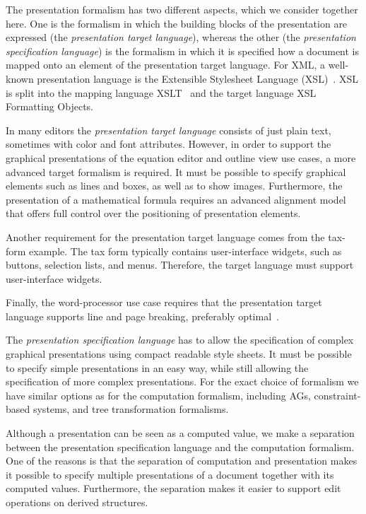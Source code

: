 \documentclass{speauth}
\begin{document}
The presentation formalism has two different aspects, which we consider together here. One is the formalism in which the building blocks of the presentation are expressed (the {\em presentation target language}), whereas the other  (the {\em presentation specification language}) is the formalism in which it is specified how a document is mapped onto an element of the presentation target language. For XML, a well-known presentation language is the Extensible Stylesheet Language (XSL)~\cite{xsl10}. XSL is split into the mapping language XSLT~\cite{xslt10} and the target language XSL Formatting Objects. %

In many editors the {\em presentation target language} consists of just plain text, sometimes with color and font attributes. However, in order to support the graphical presentations of the equation editor and outline view use cases, a more advanced target formalism is required. It must be possible to specify graphical elements such as lines and boxes, as well as to show images. Furthermore, the presentation of a mathematical formula requires an advanced alignment model that offers full control over the positioning of presentation elements.

Another requirement for the presentation target language comes from the tax-form example. The tax form typically contains user-interface widgets, such as buttons, selection lists, and menus. Therefore, the target language must support user-interface widgets.

Finally, the word-processor use case requires that the presentation target language supports line and page breaking, preferably optimal~\cite{knuth82breaking}. 

The {\em presentation specification language} has to allow the specification of complex graphical presentations using compact readable style sheets. It must be possible to specify simple presentations in an easy way, while still allowing the specification of more complex presentations. For the exact choice of formalism we have similar options as for the computation formalism, including AGs, constraint-based systems, and tree transformation formalisms.

Although a presentation can be seen as a computed value, we make a separation between the presentation specification language and the computation formalism. One of the reasons is that the separation of computation and presentation makes it possible to specify multiple presentations of a document together with its computed values. Furthermore, the separation makes it easier to support edit operations on derived structures.
\end{document}
